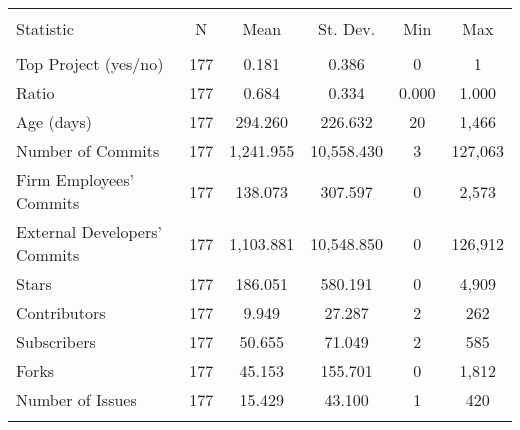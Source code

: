 \begin{tabular}{@{\extracolsep{5pt}}lccccc}
\\[-1.8ex]\hline
\hline \\[-1.8ex]
Statistic & \multicolumn{1}{c}{N} & \multicolumn{1}{c}{Mean} & \multicolumn{1}{c}{St. Dev.} & \multicolumn{1}{c}{Min} & \multicolumn{1}{c}{Max} \\
\hline \\[-1.8ex]
Top Project (yes/no) & 177 & 0.181 & 0.386 & 0 & 1 \\
Ratio & 177 & 0.684 & 0.334 & 0.000 & 1.000 \\
Age (days) & 177 & 294.260 & 226.632 & 20 & 1,466 \\
Number of Commits & 177 & 1,241.955 & 10,558.430 & 3 & 127,063 \\
Firm Employees' Commits & 177 & 138.073 & 307.597 & 0 & 2,573 \\
External Developers' Commits & 177 & 1,103.881 & 10,548.850 & 0 & 126,912 \\
Stars & 177 & 186.051 & 580.191 & 0 & 4,909 \\
Contributors & 177 & 9.949 & 27.287 & 2 & 262 \\
Subscribers & 177 & 50.655 & 71.049 & 2 & 585 \\
Forks & 177 & 45.153 & 155.701 & 0 & 1,812 \\
Number of Issues & 177 & 15.429 & 43.100 & 1 & 420 \\
\hline \\[-1.8ex]
\end{tabular}

